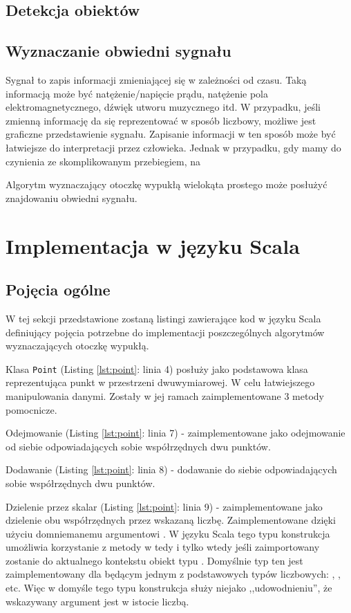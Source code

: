 		\section{Detekcja obiektów}
        \section{Wyznaczanie obwiedni sygnału}
        Sygnał to zapis informacji zmieniającej się w zależności od czasu. Taką informacją może być natężenie/napięcie prądu, natężenie pola elektromagnetycznego, dźwięk utworu muzycznego itd. W przypadku, jeśli zmienną informację da się  reprezentować w sposób liczbowy, możliwe jest graficzne przedstawienie sygnału. Zapisanie informacji w ten sposób może być łatwiejsze do interpretacji przez człowieka. Jednak w przypadku, gdy mamy do czynienia ze skomplikowanym przebiegiem, na
        
        Algorytm wyznaczający otoczkę wypukłą wielokąta prostego może posłużyć znajdowaniu obwiedni sygnału.
        
   \chapter{Implementacja w języku Scala}
   		\section{Pojęcia ogólne}
   		W tej sekcji przedstawione zostaną listingi zawierające kod w języku Scala definiujący pojęcia potrzebne do implementacji poszczególnych algorytmów wyznaczających otoczkę wypukłą.
   		
   		Klasa \texttt{Point} (Listing \ref{lst:point}: linia 4) posłuży jako podstawowa klasa reprezentująca punkt w przestrzeni dwuwymiarowej. W celu łatwiejszego manipulowania danymi. Zostały w jej ramach zaimplementowane 3 metody pomocnicze.
   		
   		Odejmowanie (Listing \ref{lst:point}: linia 7) - zaimplementowane jako odejmowanie od siebie odpowiadających sobie współrzędnych dwu punktów.
   		
   		Dodawanie (Listing \ref{lst:point}: linia 8) - dodawanie do siebie odpowiadających sobie współrzędnych dwu punktów.
   		
   		Dzielenie przez skalar (Listing \ref{lst:point}: linia 9) - zaimplementowane jako dzielenie obu współrzędnych przez wskazaną liczbę. Zaimplementowane dzięki użyciu domniemanemu argumentowi . W języku Scala tego typu konstrukcja umożliwia korzystanie z metody \scala{/} w tedy i tylko wtedy jeśli zaimportowany zostanie do aktualnego kontekstu obiekt typu . Domyślnie typ ten jest zaimplementowany dla  będącym jednym z podstawowych typów liczbowych: , ,  etc. Więc w domyśle tego typu konstrukcja służy niejako ,,udowodnieniu'', że wskazywany argument jest w istocie liczbą.
   		
